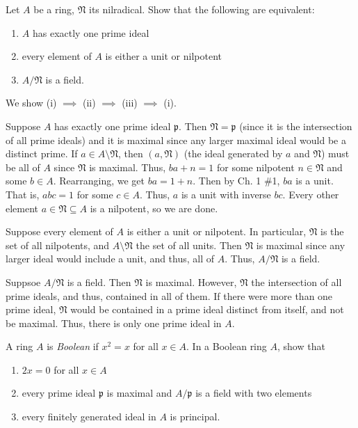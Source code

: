 \documentclass[12 pt, letterpaper]{hmcpset}
\begin{document}
\pagebreak

\begin{problem}[A \& M Ch. 1 \#10.]
	Let $A$ be a ring, $\mathfrak{N}$ its nilradical. Show that the following are equivalent:
	\begin{enumerate}[label = (\roman*)]
		\item $A$ has exactly one prime ideal
		\item every element of $A$ is either a unit or nilpotent
		\item $A / \mathfrak{N}$ is a field.
	\end{enumerate}
\end{problem}

\begin{solution}
	We show (i) $\implies$ (ii) $\implies$ (iii) $\implies$ (i).

	Suppose $A$ has exactly one prime ideal $\mathfrak{p}$. Then $\mathfrak{N} = \mathfrak{p}$ (since it is the intersection of all prime ideals) and it is maximal since any larger maximal ideal would be a distinct prime. If $a \in A \setminus \mathfrak{N}$, then $(a, \mathfrak{N})$ (the ideal generated by $a$ and $\mathfrak{N}$) must be all of $A$ since $\mathfrak{N}$ is maximal. Thus, $ba + n = 1$ for some nilpotent $n \in \mathfrak{N}$ and some $b \in A$. Rearranging, we get $ba = 1 + n$. Then by Ch. 1 \#1, $ba$ is a unit. That is, $abc = 1$ for some $c \in A$. Thus, $a$ is a unit with inverse $bc$. Every other element $a \in \mathfrak{N} \subseteq A$ is a nilpotent, so we are done.

	Suppose every element of $A$ is either a unit or nilpotent. In particular, $\mathfrak{N}$ is the set of all nilpotents, and $A \setminus \mathfrak{N}$ the set of all units. Then $\mathfrak{N}$ is maximal since any larger ideal would include a unit, and thus, all of $A$. Thus, $A / \mathfrak{N}$ is a field.

	Suppsoe $A / \mathfrak{N}$ is a field. Then $\mathfrak{N}$ is maximal. However, $\mathfrak{N}$ the intersection of all prime ideals, and thus, contained in all of them. If there were more than one prime ideal, $\mathfrak{N}$ would be contained in a prime ideal distinct from itself, and not be maximal. Thus, there is only one prime ideal in $A$.
\end{solution}

\pagebreak

\begin{problem}[A \& M Ch. 1 \#11.]
	A ring $A$ is \emph{Boolean} if $x^{2} = x$ for all $x \in A$. In a Boolean ring $A$, show that
	\begin{enumerate}[label = (\roman*)]
		\item $2x = 0$ for all $x \in A$ 
		\item every prime ideal $\mathfrak{p}$ is maximal and $A / \mathfrak{p}$ is a field with two elements
		\item every finitely generated ideal in $A$ is principal.
	\end{enumerate}
\end{problem}
\end{document}
